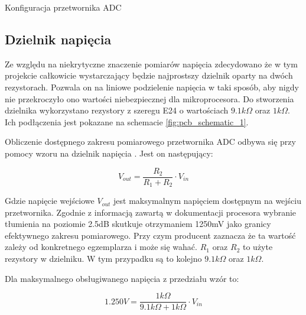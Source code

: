         \begin{kod}
          \inputminted[firstline=8,lastline=17]{cpp}{esp/listings/adc.cpp}
          \caption{Konfiguracja przetwornika ADC}
          \label{code:adc1}
          \vspace{2em}
        \end{kod}
        

    

        
    \subsection{Dzielnik napięcia}
        Ze względu na niekrytyczne znaczenie pomiarów napięcia zdecydowano że w tym projekcie całkowicie wystarczający będzie najprostszy dzielnik oparty na dwóch rezystorach. Pozwala on na liniowe podzielenie napięcia w taki sposób, aby nigdy nie przekroczyło ono wartości niebezpiecznej dla mikroprocesora. Do stworzenia dzielnika wykorzystano rezystory z szeregu E24 \cite{szereg} o wartościach $9.1k \Omega $ oraz $1k \Omega $. Ich podłączenia jest pokazane na schemacie \ref{fig:pcb_schematic_1}.
        
        Obliczenie dostępnego zakresu pomiarowego przetwornika ADC odbywa się przy pomocy wzoru na dzielnik napięcia \cite{dzielnik}. Jest on następujący:
        
        \vspace{1em}
        \begin{displaymath}
          V_{out} = \frac{ R_2 }{ R_1 + R_2 } \cdot V_{in}
        \end{displaymath}
        \vspace{1em}
        
        Gdzie napięcie wejściowe $V_{out}$ jest maksymalnym napięciem dostępnym na wejściu przetwornika. Zgodnie z informacją zawartą w dokumentacji procesora \cite{esp32} wybranie tłumienia na poziomie 2.5dB skutkuje otrzymaniem 1250mV jako granicy efektywnego zakresu pomiarowego. Przy czym producent zaznacza że ta wartość zależy od konkretnego egzemplarza i może się wahać. $R_1$ oraz $R_2$ to użyte rezystory w dzielniku. W tym przypadku są to kolejno $9.1k \Omega $ oraz $1k \Omega $.
        
        Dla maksymalnego obsługiwanego napięcia z przedziału wzór to:
        
        \vspace{1em}
        \begin{displaymath}
          1.250V = \frac{ 1k \Omega  }{ 9.1k \Omega  + 1k \Omega  } \cdot V_{in}
        \end{displaymath}
        \vspace{1em}
        
